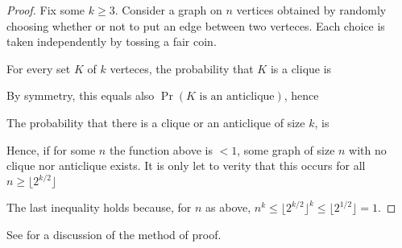\documentclass[scombinatorics.tex]{subfiles}
\begin{document}
\begin{proof}
  Fix some $k\ge3$. Consider a graph on $n$ vertices obtained by randomly choosing whether or not to put an edge between two verteces.
  Each choice is taken independently by tossing a fair coin.

  For every set $K$ of $k$ verteces, the probability that $K$ is a clique is 


  By symmetry, this equals also $\Pr(K\textrm{ is an anticlique})$, hence


  The probability that there is a clique or an anticlique of size $k$, is 


  Hence, if for some $n$ the function above is $<1$, some graph of size $n$ with no clique nor anticlique exists. 
  It is only let to verity that this occurs for all $n\ge\lfloor2^{k/2}\rfloor$ 


  
  

The last inequality holds because, for $n$ as above, $n^k\le\lfloor2^{k/2}\rfloor^k\le\lfloor2^{1/2}\rfloor= 1$.
\end{proof}

See \cite{AS} for a discussion of the method of proof.
\end{document}

